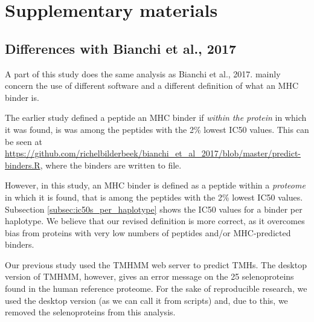 \appendix
\section{Supplementary materials}

\subsection{Differences with Bianchi et al., 2017}

A part of this study does the same analysis as Bianchi et al., 2017.
mainly concern the use of different
software and a different definition of what an MHC binder is.


The earlier study defined a peptide an MHC binder 
if \emph{within the protein} in which it was found, 
is was among the peptides with the 2\% lowest IC50 values.
This can be seen at \url{https://github.com/richelbilderbeek/bianchi_et_al_2017/blob/master/predict-binders.R},
where the binders are written to file.

However, in this study, an MHC binder is defined as a peptide within a \emph{proteome} in which it is found, that is among the peptides with the 2\% lowest IC50 values.
Subsection \ref{subsec:ic50s_per_haplotype} shows the IC50 values
for a binder per haplotype. We believe that our revised definition is more correct, as it overcomes bias from proteins with very low numbers of peptides and/or MHC-predicted binders.


Our previous study used the TMHMM web server
to predict TMHs.
The desktop version of TMHMM, however, gives an
error message on the 25 selenoproteins found in the human
reference proteome.
For the sake of reproducible research, we used the desktop version (as
we can call it from scripts) and, due to this, we removed the
selenoproteins from this analysis.

